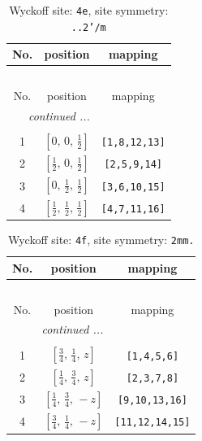 \documentclass[fleqn,8pt]{jsarticle}
\begin{document}
\begin{longtable}{ccc}
\caption{Wyckoff site: {\tt 4e}, site symmetry: {\tt ..2'/m}}
 \\
 \hline \hline
No. & position & mapping \\ \hline \endfirsthead

\multicolumn{2}{l}{\tablename\ \thetable{}} \\
 \hline \hline
No. & position & mapping \\ \hline \endhead

 \hline \hline
\multicolumn{2}{r}{\footnotesize\it continued ...} \\ \endfoot

 \hline \hline
\multicolumn{2}{r}{} \\ \endlastfoot

1 & $\left[ 0,\, 0,\, \frac{1}{2} \right]$ & {\tt [1,8,12,13]} \\ \hline
2 & $\left[ \frac{1}{2},\, 0,\, \frac{1}{2} \right]$ & {\tt [2,5,9,14]} \\ \hline
3 & $\left[ 0,\, \frac{1}{2},\, \frac{1}{2} \right]$ & {\tt [3,6,10,15]} \\ \hline
4 & $\left[ \frac{1}{2},\, \frac{1}{2},\, \frac{1}{2} \right]$ & {\tt [4,7,11,16]} \\
\end{longtable}
\renewcommand{\arraystretch}{1.2}
\begin{longtable}{ccc}
\caption{Wyckoff site: {\tt 4f}, site symmetry: {\tt 2mm.}}
 \\
 \hline \hline
No. & position & mapping \\ \hline \endfirsthead

\multicolumn{2}{l}{\tablename\ \thetable{}} \\
 \hline \hline
No. & position & mapping \\ \hline \endhead

 \hline \hline
\multicolumn{2}{r}{\footnotesize\it continued ...} \\ \endfoot

 \hline \hline
\multicolumn{2}{r}{} \\ \endlastfoot

1 & $\left[ \frac{3}{4},\, \frac{1}{4},\, z \right]$ & {\tt [1,4,5,6]} \\ \hline
2 & $\left[ \frac{1}{4},\, \frac{3}{4},\, z \right]$ & {\tt [2,3,7,8]} \\ \hline
3 & $\left[ \frac{1}{4},\, \frac{3}{4},\, - z \right]$ & {\tt [9,10,13,16]} \\ \hline
4 & $\left[ \frac{3}{4},\, \frac{1}{4},\, - z \right]$ & {\tt [11,12,14,15]} \\
\end{longtable}
\end{document}
